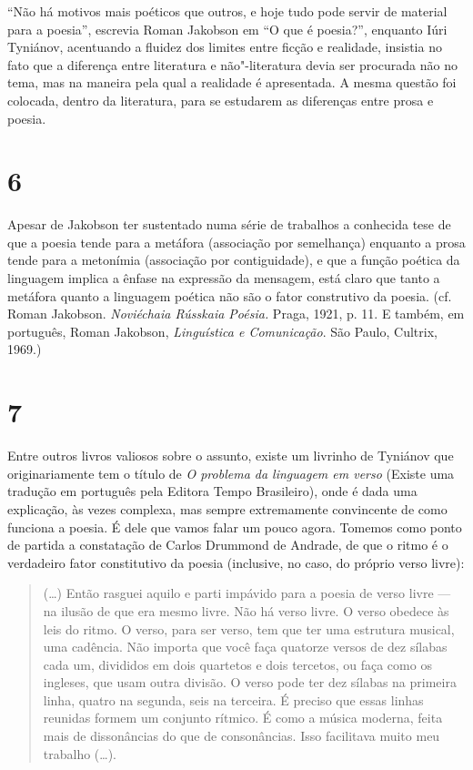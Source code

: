 ``Não há motivos mais poéticos que outros, e hoje tudo pode servir de
material para a poesia'', escrevia Roman Jakobson em ``O que é
poesia?'', enquanto Iúri Tyniánov, acentuando a fluidez dos limites
entre ficção e realidade, insistia no fato que a diferença entre
literatura e não"-literatura devia ser procurada não no tema, mas na
maneira pela qual a realidade é apresentada. A mesma questão foi
colocada, dentro da literatura, para se estudarem as diferenças entre
prosa e poesia.

\section{6}

Apesar de Jakobson ter sustentado numa série de trabalhos a conhecida
tese de que a poesia tende para a metáfora (associação por semelhança)
enquanto a prosa tende para a metonímia (associação por contiguidade), e
que a função poética da linguagem implica a ênfase na expressão da mensagem, está
claro que tanto a metáfora quanto a linguagem poética não são o fator
construtivo da poesia. (cf. Roman Jakobson. \emph{Noviéchaia Rússkaia
Poésia.} Praga, 1921, p. 11. E também, em português, Roman Jakobson,
\emph{Linguística e Comunicação}. São Paulo, Cultrix, 1969.)

\section{7}

Entre outros livros valiosos sobre o assunto, existe um livrinho de
Tyniánov que originariamente tem o título de \emph{O problema da
linguagem em verso} (Existe uma tradução em
português pela Editora Tempo Brasileiro), onde é dada uma explicação, às
vezes complexa, mas sempre extremamente convincente de como funciona a
poesia. É dele que vamos falar um pouco agora. Tomemos como ponto de
partida a constatação de Carlos Drummond de Andrade, de que o ritmo é o
verdadeiro fator constitutivo da poesia (inclusive, no caso, do próprio
verso livre):

\begin{quote} 
(\ldots{}) Então rasguei aquilo e parti impávido para a poesia
de verso livre --- na ilusão de que era mesmo livre. Não há verso livre.
O verso obedece às leis do ritmo. O verso, para ser verso, tem que ter
uma estrutura musical, uma cadência. Não importa que você faça quatorze
versos de dez sílabas cada um, divididos em dois quartetos e dois
tercetos, ou faça como os ingleses, que usam outra divisão. O verso pode
ter dez sílabas na primeira linha, quatro na segunda, seis na terceira.
É preciso que essas linhas reunidas formem um conjunto rítmico. É como a
música moderna, feita mais de dissonâncias do que de consonâncias. Isso
facilitava muito meu trabalho (\ldots{}).
\end{quote}

